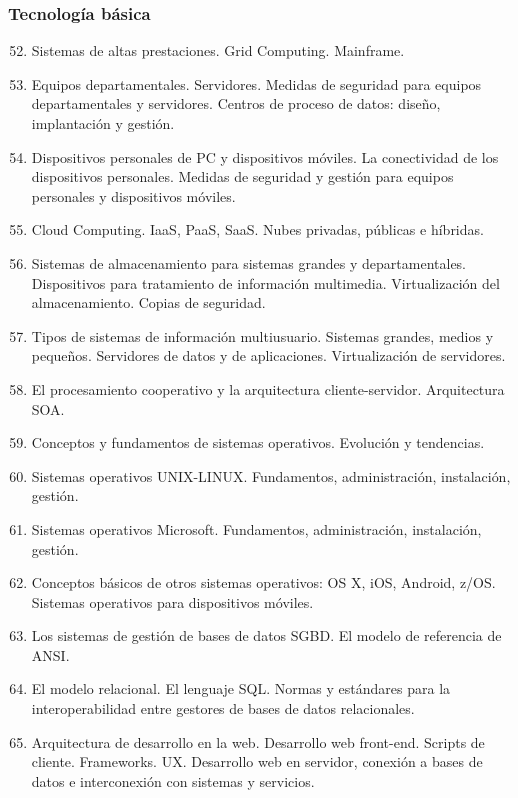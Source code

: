 	\subsubsection{Tecnología básica}
	\begin{enumerate}
		\setcounter{enumi}{51}
		\item Sistemas de altas prestaciones. Grid Computing. Mainframe.
		\item Equipos departamentales. Servidores. Medidas de seguridad para equipos departamentales y servidores. Centros de proceso de datos: diseño, implantación y gestión.
		\item Dispositivos personales de PC y dispositivos móviles. La conectividad de los dispositivos personales. Medidas de seguridad y gestión para equipos personales y dispositivos móviles.
		\item Cloud Computing. IaaS, PaaS, SaaS. Nubes privadas, públicas e híbridas.
		\item Sistemas de almacenamiento para sistemas grandes y departamentales. Dispositivos para tratamiento de información multimedia. Virtualización del almacenamiento. Copias de seguridad.
		\item Tipos de sistemas de información multiusuario. Sistemas grandes, medios y pequeños. Servidores de datos y de aplicaciones. Virtualización de servidores.
		\item El procesamiento cooperativo y la arquitectura cliente-servidor. Arquitectura SOA.
		\item Conceptos y fundamentos de sistemas operativos. Evolución y tendencias.
		\item Sistemas operativos UNIX-LINUX. Fundamentos, administración, instalación, gestión.
		\item Sistemas operativos Microsoft. Fundamentos, administración, instalación, gestión.
		\item Conceptos básicos de otros sistemas operativos: OS X, iOS, Android, z/OS. Sistemas operativos para dispositivos móviles.
		\item Los sistemas de gestión de bases de datos SGBD. El modelo de referencia de ANSI.
		\item El modelo relacional. El lenguaje SQL. Normas y estándares para la interoperabilidad entre gestores de bases de datos relacionales.
		\item Arquitectura de desarrollo en la web. Desarrollo web front-end. Scripts de cliente. Frameworks. UX. Desarrollo web en servidor, conexión a bases de datos e interconexión con sistemas y servicios.

\end{enumerate}
